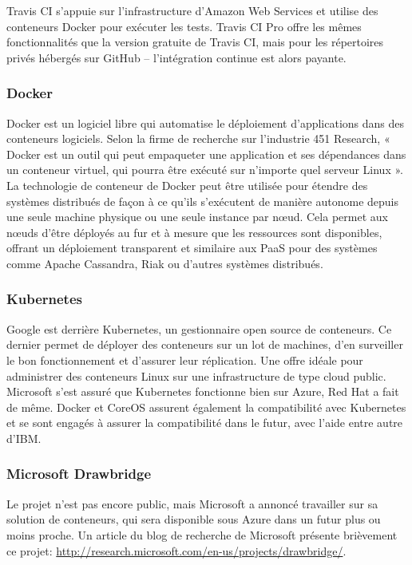     Travis CI s'appuie sur l'infrastructure d'Amazon Web Services et utilise des conteneurs Docker pour exécuter les tests. Travis CI Pro offre les mêmes fonctionnalités que la version gratuite de Travis CI, mais pour les répertoires privés hébergés sur GitHub -- l'intégration continue est alors payante.

    \subsubsection{Docker}
    Docker est un logiciel libre qui automatise le déploiement d'applications dans des conteneurs logiciels. Selon la firme de recherche sur l'industrie 451 Research, « Docker est un outil qui peut empaqueter une application et ses dépendances dans un conteneur virtuel, qui pourra être exécuté sur n'importe quel serveur Linux ».\\

    La technologie de conteneur de Docker peut être utilisée pour étendre des systèmes distribués de façon à ce qu'ils s'exécutent de manière autonome depuis une seule machine physique ou une seule instance par nœud. Cela permet aux nœuds d'être déployés au fur et à mesure que les ressources sont disponibles, offrant un déploiement transparent et similaire aux PaaS pour des systèmes comme Apache Cassandra, Riak ou d'autres systèmes distribués.

    \subsubsection{Kubernetes}
    Google est derrière Kubernetes, un gestionnaire open source de conteneurs. Ce dernier permet de déployer des conteneurs sur un lot de machines, d’en surveiller le bon fonctionnement et d’assurer leur réplication. Une offre idéale pour administrer des conteneurs Linux sur une infrastructure de type cloud public. Microsoft s'est assuré que Kubernetes fonctionne bien sur Azure, Red Hat a fait de même. Docker et CoreOS assurent également la compatibilité avec Kubernetes et se sont engagés à assurer la compatibilité dans le futur, avec l'aide entre autre d'IBM.

    \subsubsection{Microsoft Drawbridge}
    Le projet n'est pas encore public, mais Microsoft a annoncé travailler sur sa solution de conteneurs, qui sera disponible sous Azure dans un futur plus ou moins proche. Un article du blog de recherche de Microsoft présente brièvement ce projet: \url{http://research.microsoft.com/en-us/projects/drawbridge/}.


